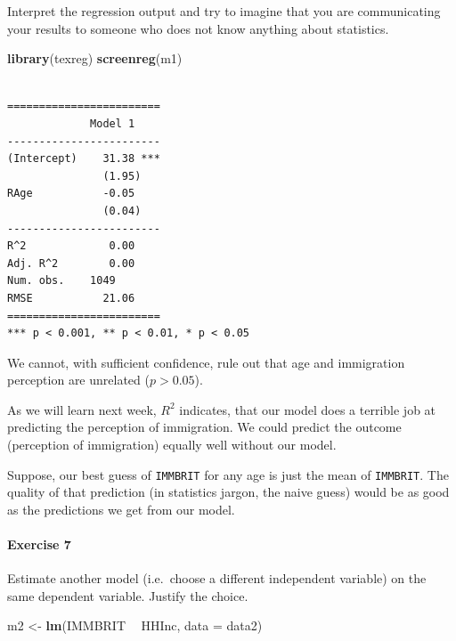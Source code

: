 \documentclass[]{article}
\newenvironment{Shaded}{\begin{snugshade}}{\end{snugshade}}
\newcommand{\KeywordTok}[1]{\textcolor[rgb]{0.13,0.29,0.53}{\textbf{#1}}}
\newcommand{\DataTypeTok}[1]{\textcolor[rgb]{0.13,0.29,0.53}{#1}}
\newcommand{\StringTok}[1]{\textcolor[rgb]{0.31,0.60,0.02}{#1}}
\newcommand{\OperatorTok}[1]{\textcolor[rgb]{0.81,0.36,0.00}{\textbf{#1}}}
\newcommand{\NormalTok}[1]{#1}
\let\oldparagraph\paragraph
\renewcommand{\paragraph}[1]{\oldparagraph{#1}\mbox{}}
\theoremstyle{definition}
\theoremstyle{definition}
\theoremstyle{definition}
\theoremstyle{remark}
\begin{document}
Interpret the regression output and try to imagine that you are
communicating your results to someone who does not know anything about
statistics.

\begin{Shaded}
\begin{Highlighting}[]
\KeywordTok{library}\NormalTok{(texreg)}
\KeywordTok{screenreg}\NormalTok{(m1)}
\end{Highlighting}
\end{Shaded}

\begin{verbatim}

========================
             Model 1    
------------------------
(Intercept)    31.38 ***
               (1.95)   
RAge           -0.05    
               (0.04)   
------------------------
R^2             0.00    
Adj. R^2        0.00    
Num. obs.    1049       
RMSE           21.06    
========================
*** p < 0.001, ** p < 0.01, * p < 0.05
\end{verbatim}

We cannot, with sufficient confidence, rule out that age and immigration
perception are unrelated (\(p > 0.05\)).

As we will learn next week, \(R^2\) indicates, that our model does a
terrible job at predicting the perception of immigration. We could
predict the outcome (perception of immigration) equally well without our
model.

Suppose, our best guess of \texttt{IMMBRIT} for any age is just the mean
of \texttt{IMMBRIT}. The quality of that prediction (in statistics
jargon, the naive guess) would be as good as the predictions we get from
our model.

\paragraph{Exercise 7}\label{exercise-7-4}

Estimate another model (i.e.~choose a different independent variable) on
the same dependent variable. Justify the choice.

\begin{Shaded}
\begin{Highlighting}[]
\NormalTok{m2 <-}\StringTok{ }\KeywordTok{lm}\NormalTok{(IMMBRIT }\OperatorTok{~}\StringTok{ }\NormalTok{HHInc, }\DataTypeTok{data =}\NormalTok{ data2)}
\end{Highlighting}
\end{Shaded}
\end{document}
